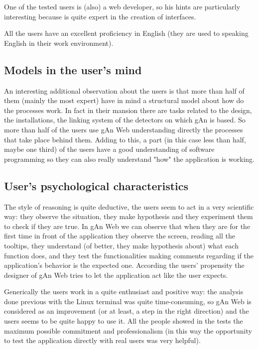 One of the tested users is (also) a web developer, so his hints are particularly interesting because is quite expert in the creation of interfaces.
 
All the users have an excellent proficiency in English (they are used to speaking English in their work environment). 

\subsection{Models in the user's mind}
An interesting additional observation about the users is that more than half of them (mainly the most expert) have in mind a structural model about how do the processes work. In fact in their mansion there are tasks related to the design, the installations, the linking system of the detectors on which gAn is based. So more than half of the users use gAn Web understanding directly the processes that take place behind them. Adding to this, a part (in this case less than half, maybe one third) of the users have a good understanding of software programming so they can also really understand "how" the application is working.

\subsection{User's psychological characteristics }
The style of reasoning is quite deductive, the users seem to act in a very scientific way: they observe the situation, they make hypothesis and they experiment them to check if they are true. In gAn Web we can observe that when they are for the first time in front of the application they observe the screen, reading all the tooltips, they understand (of better, they make hypothesis about) what each function does, and they test the functionalities making comments regarding if the application's behavior is the expected one. According the users' propensity the designer of gAn Web tries to let the application act like the user expects.   

Generically the users work in a quite enthusiast and positive way: the analysis done previous with the Linux terminal was quite time-consuming, so gAn Web is considered as an improvement (or at least, a step in the right direction) and the users seems to be quite happy to use it. All the people showed in the tests the maximum possible commitment and professionalism (in this way the opportunity to test the application directly with real users was very helpful).

